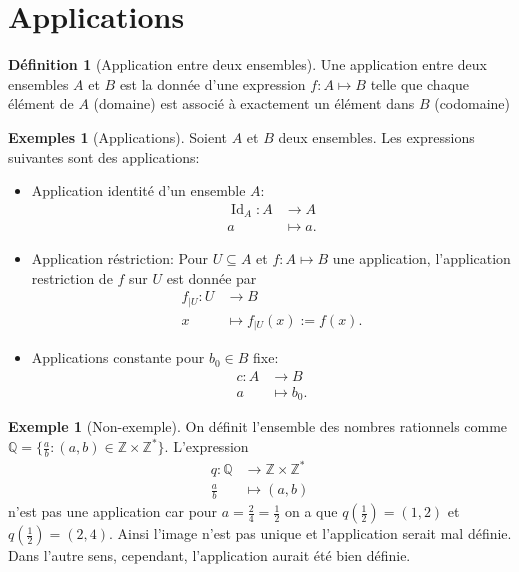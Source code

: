 \documentclass[oneside,12pt,french,table]{book}
\DeclareMathOperator{\id}{Id}
\theoremstyle{definition}
\theoremstyle{definition}
\newtheorem*{example}{Exemple}
\newtheorem*{examples}{Exemples}
\theoremstyle{definition}
\newtheorem{definition}{Définition}[chapter]
\begin{document}
\section{Applications}
\begin{definition}[Application entre deux ensembles]
Une application entre deux ensembles $A$ et $B$ est la donnée d'une expression $f:A\mapsto B$ telle que chaque élément de $A$ (domaine) est associé à exactement un élément dans $B$ (codomaine)
\end{definition}
%
\begin{examples}[Applications] Soient $A$ et $B$ deux ensembles. Les expressions suivantes sont des applications:
\begin{itemize}
	\item Application identité d'un ensemble $A$:
		\begin{align*}
			\id_A: A &\longrightarrow A \\
			a &\longmapsto a
		.\end{align*}
	\item Application réstriction: Pour $U \subseteq A$ et $f:A\mapsto B$ une application, l'application restriction de $f$ sur $U$ est donnée par
		\begin{align*}
			f_{|U}: U &\longrightarrow  B\\
			 x&\longmapsto f_{|U}(x):=f(x)
		.\end{align*}
	\item Applications constante pour $b_0 \in B$ fixe: 
		\begin{align*}
			c:  A&\longrightarrow  B\\
			a &\longmapsto b_0
		.\end{align*}
\end{itemize}
\end{examples}
\begin{example}[Non-exemple]
	On définit l'ensemble des nombres rationnels comme $\mathbb{Q} =\{\frac{a}{b}:(a,b)\in \mathbb{Z} \times \mathbb{Z} ^*\}$. L'expression
\begin{align*}
	q: \mathbb{Q}  &\longrightarrow \mathbb{Z} \times \mathbb{Z} ^* \\
	\frac{a}{b} &\longmapsto (a,b)
\end{align*}
n'est pas une application car pour $a=\frac{2}{4}=\frac{1}{2}$ on a que $q(\frac{1}{2})=(1,2)$  et $q(\frac{1}{2})=(2,4)$. Ainsi l'image n'est pas unique et l'application serait mal définie. \\
Dans l'autre sens, cependant, l'application aurait été bien définie.
\end{example}
\end{document}

